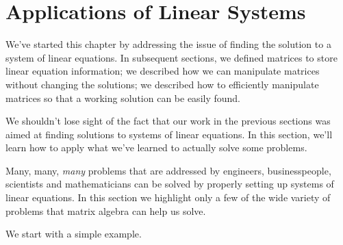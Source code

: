 \section{Applications of Linear Systems}\label{sec:solving_systems}


We've started this chapter by addressing the issue of finding the solution to a system of linear equations. In subsequent sections, we  defined matrices to store linear equation information; we described how we can manipulate matrices without changing the solutions; we described how to efficiently manipulate matrices so that a working solution can be easily found.

We shouldn't lose sight of the fact that  our work in the previous sections was aimed at finding solutions to systems of linear equations. In this section, we'll learn how to apply what we've learned to actually solve some problems. 

Many, many, \textit{many} problems that are addressed by engineers, businesspeople, scientists and mathematicians can be solved by properly setting up systems of linear equations. In this section we highlight only a few of the wide variety of problems that matrix algebra can help us solve.

We start with a simple example.

\medskip

